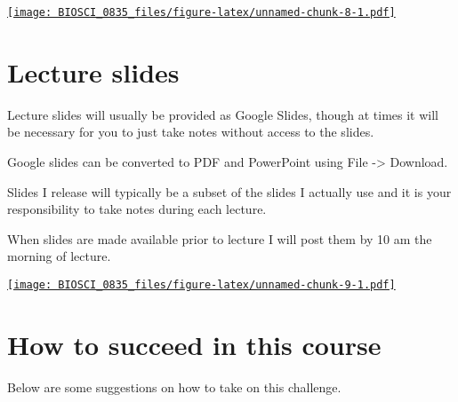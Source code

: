\documentclass[
]{book}
\begin{document}
\href{https://docs.google.com/spreadsheets/d/1jxEavcRU4_lom0_x7q4YgjAeHo5lNMWX3kDjdNyVKfo/edit?usp=sharing}{\texttt{[image: BIOSCI\_0835\_files/figure-latex/unnamed-chunk-8-1.pdf]}}

\hypertarget{lecture-slides}{%
\chapter{Lecture slides}\label{lecture-slides}}

Lecture slides will usually be provided as Google Slides, though at times it will be necessary for you to just take notes without access to the slides.

Google slides can be converted to PDF and PowerPoint using File -\textgreater{} Download.

Slides I release will typically be a subset of the slides I actually use and it is your responsibility to take notes during each lecture.

When slides are made available prior to lecture I will post them by 10 am the morning of lecture.

\href{https://upload.wikimedia.org/wikipedia/commons/thumb/1/16/Google_Slides_2020_Logo.svg/174px-Google_Slides_2020_Logo.svg.png}{\texttt{[image: BIOSCI\_0835\_files/figure-latex/unnamed-chunk-9-1.pdf]}}

\hypertarget{how-to-succeed-in-this-course}{%
\chapter{How to succeed in this course}\label{how-to-succeed-in-this-course}}

Below are some suggestions on how to take on this challenge.
\end{document}
